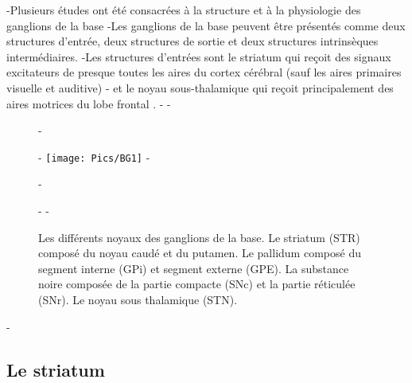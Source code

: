 -Plusieurs études ont été consacrées à la structure et à la physiologie des ganglions de la base \citep{Houk,Davis and Beiser 1995, Graybiel:1998, DeLong:2000}
-Les ganglions de la base peuvent être présentés comme deux structures d'entrée, deux structures de sortie et deux structures intrinsèques intermédiaires.
-Les structures d'entrées sont le striatum qui reçoit des signaux excitateurs de presque toutes les aires du cortex cérébral (sauf les aires primaires visuelle et auditive) 
-\citep{Cherubini:1988,Kemp:1970,kitai:1976,McGeer:1977} et le noyau sous-thalamique qui reçoit principalement des aires motrices du lobe frontal \citep{Fujimoto:1993, Monakow:1978, Rouzaire:1987}.
- 
-\begin{figure}[htb]
-  \begin{center}
-    \texttt{[image: Pics/BG1]}
-  \end{center}
-  \caption {Les différents noyaux des ganglions de la base. Le striatum (STR) composé du noyau caudé et du putamen. Le pallidum composé du segment interne (GPi) et segment externe (GPE). La substance noire composée de la partie compacte (SNc) et la partie réticulée (SNr). Le noyau sous thalamique (STN).}
-  \label{fig:BG1}
-\end{figure}
 
-\subsection{Le striatum}
 
